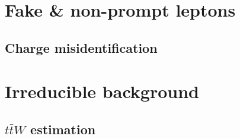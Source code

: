 \documentclass[../thesis.tex]{subfiles}
\begin{document}
\vspace{-1\baselineskip}

\section{Fake \& non-prompt leptons}
\label{sec:fake}
\subsection*{Charge misidentification}

\section{Irreducible background}
\label{sec:irrbg}
\subsection*{$t\bar{t}W$ estimation}
\end{document}
